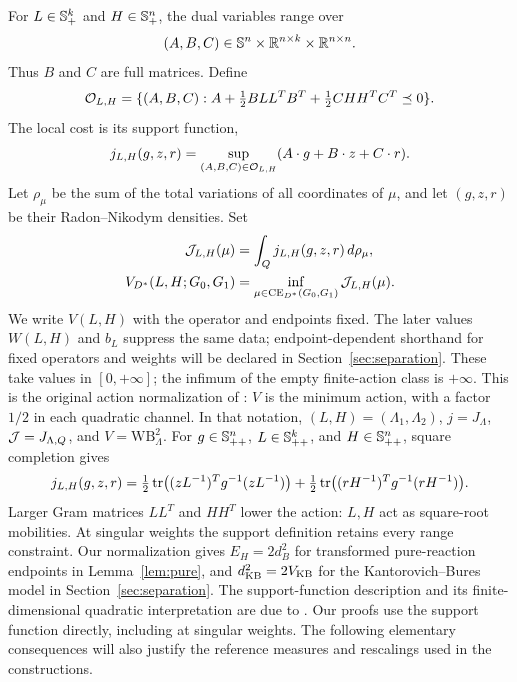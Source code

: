 For $L\in\mathbb S_+^k$ and $H\in\mathbb S_+^n$, the dual variables range over
\[
 (A,B,C)\in\mathbb S^n\times\mathbb R^{n\times k}\times\mathbb R^{n\times n}.
\]
Thus $B$ and $C$ are full matrices. Define
\begin{equation}\label{eq:dualset}
 \mathcal O_{L,H}=\{(A,B,C):
 A+\tfrac12BLL^TB^T+\tfrac12CHH^TC^T\preceq0\}.
\end{equation}
The local cost is its support function,
\[
 j_{L,H}(g,z,r)=\sup_{(A,B,C)\in\mathcal O_{L,H}}
                  (A\cdot g+B\cdot z+C\cdot r).
\]
Let $\rho_\mu$
be the sum of the total variations of all coordinates of $\mu$, and let
$(g,z,r)$ be their Radon--Nikodym densities. Set
\begin{equation}\label{eq:action}
 \begin{aligned}
 \mathcal J_{L,H}(\mu)&=\int_Q j_{L,H}(g,z,r)\,d\rho_\mu,\\
 V_{D^*}(L,H;G_0,G_1)&=
       \inf_{\mu\in\operatorname{CE}_{D^*}(G_0,G_1)}\mathcal J_{L,H}(\mu).
 \end{aligned}
\end{equation}
We write $V(L,H)$ with the operator and endpoints fixed. The later values
$W(L,H)$ and $b_L$ suppress the same data; endpoint-dependent shorthand
for fixed operators and weights will be declared in Section~\ref{sec:separation}.
These take values in $[0,+\infty]$; the infimum of the empty finite-action
class is $+\infty$. This is the original action normalization of
\cite{LiZou}: $V$ is the minimum action, with a factor $1/2$ in each
quadratic channel. In that notation, $(L,H)=(\Lambda_1,\Lambda_2)$,
$j=J_\Lambda$, $\mathcal J=J_{\Lambda,Q}$, and $V=\mathrm{WB}_\Lambda^2$.
For $g\in\mathbb S_{++}^n$, $L\in\mathbb S_{++}^k$, and $H\in\mathbb S_{++}^n$, square completion gives
\[
 j_{L,H}(g,z,r)
 =\tfrac12\operatorname{tr}\bigl((zL^{-1})^Tg^{-1}(zL^{-1})\bigr)
 +\tfrac12\operatorname{tr}\bigl((rH^{-1})^Tg^{-1}(rH^{-1})\bigr).
\]
Larger Gram matrices $LL^T$ and $HH^T$ lower the action: $L,H$ act as
square-root mobilities. At singular weights the support definition
retains every range constraint. Our normalization gives
$E_H=2d_B^2$ for transformed pure-reaction endpoints in
Lemma~\ref{lem:pure}, and $d_{\rm KB}^2=2V_{\rm KB}$ for the
Kantorovich--Bures model in Section~\ref{sec:separation}.
The support-function description and its finite-dimensional quadratic
interpretation are due to \cite{LiZou}. Our proofs use the support function
directly, including at singular weights. The following elementary consequences
will also justify the reference measures and rescalings used in the constructions.

